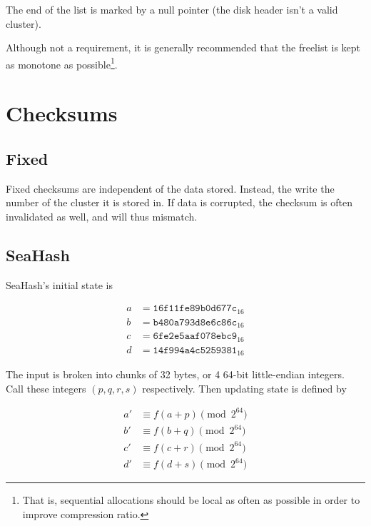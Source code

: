 \documentclass[11pt,a4paper]{report}
\begin{document}
        The end of the list is marked by a null pointer (the disk header isn't
        a valid cluster).

        Although not a requirement, it is generally recommended that
        the freelist is kept as monotone as possible\footnote{That is,
        sequential allocations should be local as often as possible in
        order to improve compression ratio.}.

    \section{Checksums}
        \subsection{Fixed}
        \label{checksum:fixed}
        Fixed checksums are independent of the data stored. Instead, the write
        the number of the cluster it is stored in. If data is corrupted, the
        checksum is often invalidated as well, and will thus mismatch.

        \subsection{SeaHash}
        \label{checksum:seahash}
        SeaHash's initial state is

        \begin{align*}
            a &= \texttt{16f11fe89b0d677c}_{16} \\
            b &= \texttt{b480a793d8e6c86c}_{16} \\
            c &= \texttt{6fe2e5aaf078ebc9}_{16} \\
            d &= \texttt{14f994a4c5259381}_{16}
        \end{align*}

        The input is broken into chunks of 32 bytes, or 4 64-bit little-endian
        integers. Call these integers $(p, q, r, s)$ respectively. Then
        updating state is defined by

        \begin{align*}
            a' &\equiv f(a + p) \pmod{2^{64}} \\
            b' &\equiv f(b + q) \pmod{2^{64}} \\
            c' &\equiv f(c + r) \pmod{2^{64}} \\
            d' &\equiv f(d + s) \pmod{2^{64}}
        \end{align*}
\end{document}
